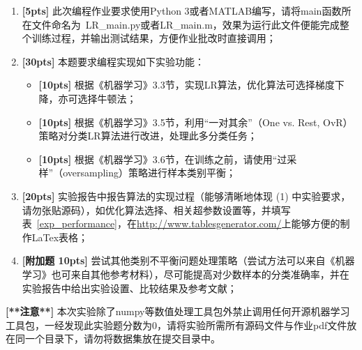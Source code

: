 \documentclass[a4paper,UTF8]{article}
\numberwithin{equation}{section}
\begin{document}
\begin{enumerate}[(1)]
    \item \textbf{[5pts]} 此次编程作业要求使用Python 3或者MATLAB编写，请将main函数所在文件命名为~LR\_main.py或者LR\_main.m，效果为运行此文件便能完成整个训练过程，并输出测试结果，方便作业批改时直接调用；	
	\item \textbf{[30pts]} 本题要求编程实现如下实验功能：
	\begin{itemize}
		\item \textbf{[10pts]} 根据《机器学习》3.3节，实现LR算法，优化算法可选择梯度下降，亦可选择牛顿法；
		\item \textbf{[10pts]} 根据《机器学习》3.5节，利用“一对其余”（One vs. Rest, OvR）策略对分类LR算法进行改进，处理此多分类任务；
		\item \textbf{[10pts]} 根据《机器学习》3.6节，在训练之前，请使用“过采样”（oversampling）策略进行样本类别平衡；
	\end{itemize}
	
	

	\item \textbf{[20pts]} 实验报告中报告算法的实现过程（能够清晰地体现 (1) 中实验要求，请勿张贴源码），如优化算法选择、相关超参数设置等，并填写表~\ref{exp_performance}，在\url{http://www.tablesgenerator.com/}上能够方便的制作LaTex表格；
	
	\item \textbf{[附加题 10pts]} 尝试其他类别不平衡问题处理策略（尝试方法可以来自《机器学习》也可来自其他参考材料），尽可能提高对少数样本的分类准确率，并在实验报告中给出实验设置、比较结果及参考文献；
\end{enumerate}
\noindent \textbf{[**注意**]} 本次实验除了numpy等数值处理工具包外禁止调用任何开源机器学习工具包，一经发现此实验题分数为0，请将实验所需所有源码文件与作业pdf文件放在同一个目录下，请勿将数据集放在提交目录中。


\newpage
{}
\end{document}
